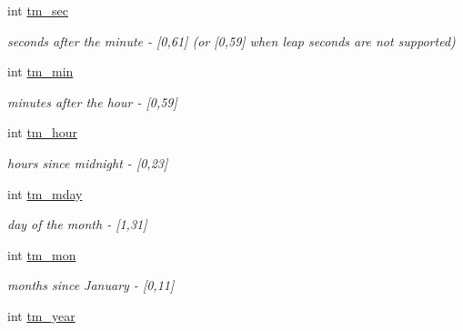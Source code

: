 \begin{DoxyCompactItemize}
\item 
\hypertarget{structtm_a4d098a9a5c03a00b2ee61e10851de81e}{int \hyperlink{structtm_a4d098a9a5c03a00b2ee61e10851de81e}{tm\-\_\-sec}}\label{structtm_a4d098a9a5c03a00b2ee61e10851de81e}

\begin{DoxyCompactList}\small\item\em seconds after the minute -\/ \mbox{[}0,61\mbox{]} (or \mbox{[}0,59\mbox{]} when {\itshape leap} {\itshape seconds} are not supported) \end{DoxyCompactList}\item 
\hypertarget{structtm_af414eb7c86cc3099595211eee4d4211b}{int \hyperlink{structtm_af414eb7c86cc3099595211eee4d4211b}{tm\-\_\-min}}\label{structtm_af414eb7c86cc3099595211eee4d4211b}

\begin{DoxyCompactList}\small\item\em minutes after the hour -\/ \mbox{[}0,59\mbox{]} \end{DoxyCompactList}\item 
\hypertarget{structtm_a3e7ca4e37f1abcaf56b8a916c38eb9fe}{int \hyperlink{structtm_a3e7ca4e37f1abcaf56b8a916c38eb9fe}{tm\-\_\-hour}}\label{structtm_a3e7ca4e37f1abcaf56b8a916c38eb9fe}

\begin{DoxyCompactList}\small\item\em hours since midnight -\/ \mbox{[}0,23\mbox{]} \end{DoxyCompactList}\item 
\hypertarget{structtm_ab8d8904bad43b0c8b96e61941c5b5310}{int \hyperlink{structtm_ab8d8904bad43b0c8b96e61941c5b5310}{tm\-\_\-mday}}\label{structtm_ab8d8904bad43b0c8b96e61941c5b5310}

\begin{DoxyCompactList}\small\item\em day of the month -\/ \mbox{[}1,31\mbox{]} \end{DoxyCompactList}\item 
\hypertarget{structtm_a112ac36fa2f593777138a417cf031e17}{int \hyperlink{structtm_a112ac36fa2f593777138a417cf031e17}{tm\-\_\-mon}}\label{structtm_a112ac36fa2f593777138a417cf031e17}

\begin{DoxyCompactList}\small\item\em months since January -\/ \mbox{[}0,11\mbox{]} \end{DoxyCompactList}\item 
\hypertarget{structtm_a33adf78fd6476b2120ce3b9c4a852053}{int \hyperlink{structtm_a33adf78fd6476b2120ce3b9c4a852053}{tm\-\_\-year}}\label{structtm_a33adf78fd6476b2120ce3b9c4a852053}


\end{DoxyCompactItemize}
